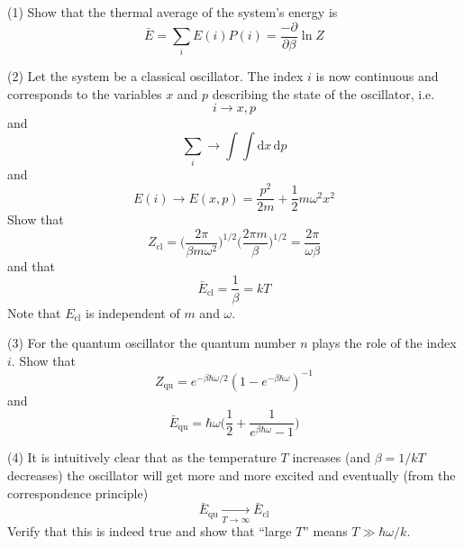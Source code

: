 \documentclass[../principles-of-quantum-mechanics.tex]{subfiles}
\begin{document}
\begin{questions}
		(1) Show that the thermal average of the system's energy is
		$$\bar{E} = \sum_i E(i)P(i) = \frac{-\partial}{\partial \beta}\ln Z$$
		
		(2) Let the system be a classical oscillator. The index $i$ is now continuous and corresponds to the variables $x$ and $p$ describing the state of the oscillator, i.e.
		$$i \to x, p$$
		and
		$$\sum_i \to \int\!\!\!\!\int \mathrm{d}x\,\mathrm{d}p$$
		and
		$$E(i) \to E(x, p) = \frac{p^2}{2m} + \frac{1}{2}m\omega^2x^2$$
		Show that
		$$Z_{\text{cl}} = \Big(\frac{2\pi}{\beta m \omega^2}\Big)^{1/2}\Big(\frac{2\pi m}{\beta}\Big)^{1/2} = \frac{2\pi}{\omega \beta}$$
		and that
		$$\bar{E}_{\text{cl}} = \frac{1}{\beta} = kT$$
		Note that $E_{\text{cl}}$ is independent of $m$ and $\omega$.
		
		(3) For the quantum oscillator the quantum number $n$ plays the role of the index $i$. Show that
		$$Z_{\text{qu}} = e^{-\beta\hbar\omega/2}(1 - e^{-\beta\hbar\omega})^{-1}$$
		and
		$$\bar{E}_{\text{qu}} = \hbar\omega\Big(\frac{1}{2} + \frac{1}{e^{\beta\hbar\omega} - 1}\Big)$$
		
		(4) It is intuitively clear that as the temperature $T$ increases (and $\beta = 1/kT$ decreases) the oscillator will get more and more excited and eventually (from the correspondence principle)
		$$\bar{E}_{\text{qu}} \xrightarrow[T\to\infty]{} \bar{E}_{\text{cl}}$$
		Verify that this is indeed true and show that ``large $T$'' means $T \gg \hbar\omega / k$.
		

\end{questions}
\end{document}
